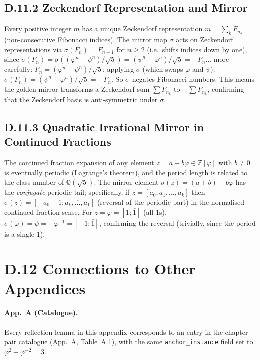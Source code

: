 \subsection*{D.11.2  Zeckendorf Representation and Mirror}

Every positive integer $m$ has a unique Zeckendorf representation
$m = \sum_{k} F_{n_k}$ (non-consecutive Fibonacci indices).
The mirror map $\sigma$ acts on Zeckendorf representations via
$\sigma(F_n) = F_{n-1}$ for $n\geq 2$ (i.e.\ shifts indices down by one),
since $\sigma(F_n) = \sigma((\varphi^n - \psi^n)/\sqrt5)
= (\psi^n - \varphi^n)/\sqrt5 = -F_n$... more carefully:
$F_n = (\varphi^n - \psi^n)/\sqrt5$; applying $\sigma$ (which swaps $\varphi$ and $\psi$):
$\sigma(F_n) = (\psi^n - \varphi^n)/\sqrt5 = -F_n$.
So $\sigma$ negates Fibonacci numbers.  This means the golden mirror transforms
a Zeckendorf sum $\sum F_{n_k}$ to $-\sum F_{n_k}$, confirming that the
Zeckendorf basis is anti-symmetric under $\sigma$.

\subsection*{D.11.3  Quadratic Irrational Mirror in Continued Fractions}

The continued fraction expansion of any element $z = a+b\varphi \in \mathbb{Z}[\varphi]$
with $b\neq 0$ is eventually periodic (Lagrange's theorem), and the period
length is related to the class number of $\mathbb{Q}(\sqrt5)$.
The mirror element $\sigma(z) = (a+b)-b\varphi$ has the
\emph{conjugate} periodic tail; specifically, if $z = [a_0; \overline{a_1,\ldots,a_k}]$
then $\sigma(z) = [-a_0 - 1; \overline{a_k,\ldots,a_1}]$ (reversal of the periodic part)
in the normalised continued-fraction sense.
For $z = \varphi = [1;\bar{1}]$ (all 1s), $\sigma(\varphi) = \psi = -\varphi^{-1} = [-1;\bar{1}]$,
confirming the reversal (trivially, since the period is a single 1).

\section*{D.12  Connections to Other Appendices}

\paragraph{App.~A (Catalogue).}
Every reflection lemma in this appendix corresponds to an entry in the
chapter-pair catalogue (App.~A, Table~A.1), with the same \texttt{anchor\_instance} field
set to $\varphi^2+\varphi^{-2}=3$.

